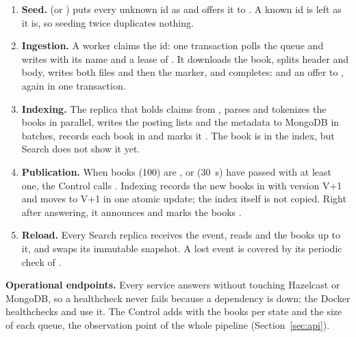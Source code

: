 \begin{enumerate}
  \item \textbf{Seed.}  (or ) puts every unknown id as
     and offers it to . A known id is left as it is, so seeding twice duplicates
    nothing.
  \item \textbf{Ingestion.} A worker claims the id: one transaction polls the queue and writes  with
    its name and a lease of . It downloads the book, splits header and body, writes both files
    and then the  marker, and completes:  and an offer to , again in
    one transaction.
  \item \textbf{Indexing.} The replica that holds  claims from , parses and
    tokenizes the books in parallel, writes the posting lists and the metadata to MongoDB in batches, records each book
    in  and marks it . The book is in the index, but Search does not show it yet.
  \item \textbf{Publication.} When  books (100) are , or 
    (30~s) have passed with at least one, the Control calls . Indexing records the new books in
     with version V+1 and moves  to V+1 in one atomic update; the index itself is not
    copied. Right after answering, it announces  and marks the books .
  \item \textbf{Reload.} Every Search replica receives the event, reads  and the books up to it, and
    swaps its immutable snapshot. A lost event is covered by its periodic check of .
\end{enumerate}

\textbf{Operational endpoints.} Every service answers  without touching Hazelcast or MongoDB, so a
healthcheck never fails because a dependency is down; the Docker healthchecks and  use it. The
Control adds  with the books per state and the size of each queue, the observation point of
the whole pipeline (Section~\ref{sec:api}).

